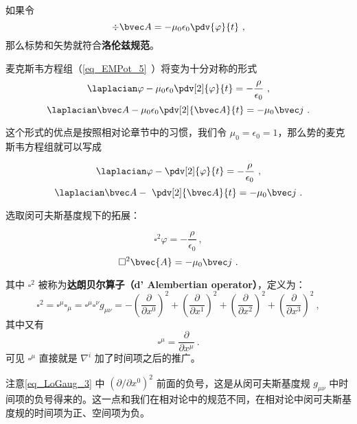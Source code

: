 
\begin{issues}
\issueDraft
\end{issues}


如果令
\begin{equation}
\div \bvec A = -\mu_0 \epsilon_0 \pdv{\varphi}{t}~,
\end{equation}
那么标势和矢势就符合\textbf{洛伦兹规范}。 

麦克斯韦方程组（\autoref{eq_EMPot_5}~）将变为十分对称的形式
\begin{equation}\label{eq_LoGaug_1}
\laplacian \varphi - \mu_0\epsilon_0 \pdv[2]{\varphi}{t} = -\frac{\rho}{\epsilon_0}~,
\end{equation}
\begin{equation}\label{eq_LoGaug_2}
\laplacian \bvec A - \mu_0\epsilon_0 \pdv[2]{\bvec A}{t} = -\mu_0 \bvec j~.
\end{equation}

这个形式的优点是按照相对论章节中的习惯，我们令 $\mu_0=\epsilon_0=1$，那么势的麦克斯韦方程组就可以写成

\begin{equation}
\laplacian \varphi -  \pdv[2]{\varphi}{t} = -\frac{\rho}{\epsilon_0}~,
\end{equation}
\begin{equation}
\laplacian \bvec A - \ \pdv[2]{\bvec A}{t} = -\mu_0 \bvec j~.
\end{equation}

选取闵可夫斯基度规下的拓展：

\begin{equation}
\square^2 \varphi = -\frac{\rho}{\epsilon_0}~,
\end{equation}
\begin{equation}
\square^2 \bvec{A} = -\mu_0 \bvec j~.
\end{equation}

其中 $\square^2$ 被称为\textbf{达朗贝尔算子（d' Alembertian operator）}，定义为：
\begin{equation}\label{eq_LoGaug_3}
\square^2=\square^\mu\square_\mu=\square^\mu\square^\nu g_{\mu\nu}=-(\frac{\partial}{\partial x^0})^2+(\frac{\partial}{\partial x^1})^2+(\frac{\partial}{\partial x^2})^2+(\frac{\partial}{\partial x^3})^2~,
\end{equation}
其中又有
\begin{equation}
\square^\mu=\frac{\partial}{\partial x^\mu}~.
\end{equation}
可见 $\square^\mu$ 直接就是 $\nabla^i$ 加了时间项之后的推广。

注意\autoref{eq_LoGaug_3} 中 $(\partial/\partial x^0)^2$ 前面的负号，这是从闵可夫斯基度规 $g_{\mu\nu}$ 中时间项的负号得来的。这一点和我们在相对论中的规范不同，在相对论中闵可夫斯基度规的时间项为正、空间项为负。





